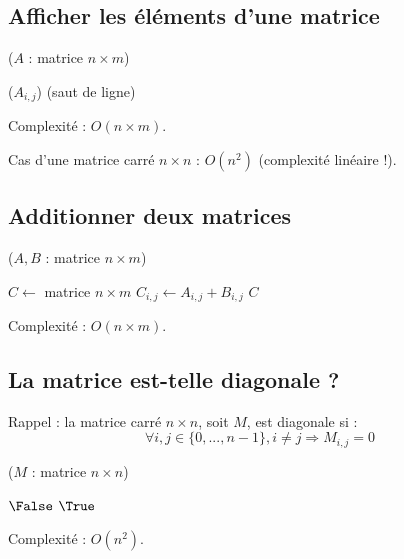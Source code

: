 


\subsection{Afficher les éléments d'une matrice}
\begin{algorithm}[H]
\caption{ ($A$ : matrice $n\times m$)}
\begin{algorithmic}[1]
	
		
		\State \print($A_{i,j}$)
	\EndFor
	\State \print(saut de ligne)
\EndFor
\end{algorithmic}
\end{algorithm}

Complexité : $O(n\times m)$.

\noindent
Cas d'une matrice carré $n\times n$ : $O(n^2)$ (complexité linéaire !).

\subsection{Additionner deux matrices}
\begin{algorithm}[H]
\caption{ ($A, B$ : matrice $n\times m$)}
\begin{algorithmic}[1]
\State $C \gets$ matrice $n\times m$
		\State $C_{i, j}\gets A_{i,j} + B_{i,j}$
	\EndFor
\EndFor
\State\Return $C$
\end{algorithmic}
\end{algorithm}

Complexité : $O(n\times m)$.


\subsection{La matrice est-telle diagonale ?}

Rappel : la matrice carré $n\times n$, soit $M$, est diagonale si :
$$\forall i,j\in\{0, ..., n-1\}, 
i\not=j \Rightarrow M_{i,j}=0$$

\begin{algorithm}[H]
\caption{ ($M$ : matrice $n\times n$)}
\begin{algorithmic}[1]
			\State\Return $\False$
		\EndIf
	\EndFor
\EndFor
\State\Return $\True$
\end{algorithmic}
\end{algorithm}

Complexité : $O(n^2)$.

